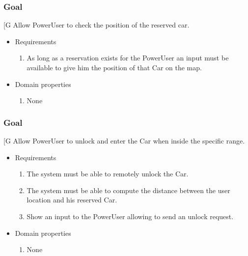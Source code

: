     \subsubsection{Goal }
    {[}G\arabic{goalctr}{]}
	Allow PowerUser to check the position of the reserved car.
    \begin{itemize}
        \item Requirements
        \begin{enumerate}[REQ]
    	    \item As long as a reservation exists for the PowerUser an input must be available to give him the position of that Car on the map.
        \end{enumerate}
        \item Domain properties
        \begin{enumerate}[PRO]
    		\item None
        \end{enumerate}
    \end{itemize}

    \subsubsection{Goal }
    {[}G\arabic{goalctr}{]}
	Allow PowerUser to unlock and enter the Car when inside the specific range.
    \begin{itemize}
        \item Requirements
        \begin{enumerate}[REQ]
    	    \item The system must be able to remotely unlock the Car.
			\item The system must be able to compute the distance between the user location and his reserved Car.
			\item Show an input to the PowerUser allowing to send an unlock request.
        \end{enumerate}
        \item Domain properties
        \begin{enumerate}[PRO]
    			\item None
        \end{enumerate}
    \end{itemize}
    
